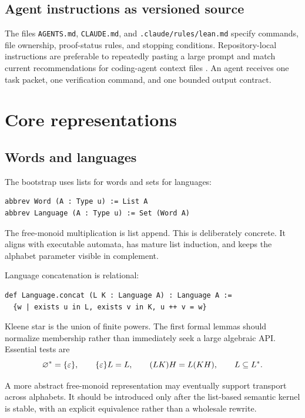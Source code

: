 \documentclass{amsart}
\begin{document}
\subsection{Agent instructions as versioned source}

The files \nolinkurl{AGENTS.md}, \nolinkurl{CLAUDE.md}, and \nolinkurl{.claude/rules/lean.md} specify commands, file ownership, proof-status rules, and stopping conditions.  Repository-local instructions are preferable to repeatedly pasting a large prompt and match current recommendations for coding-agent context files \cite{openaiAgentsMD2026,anthropicClaudeBestPractices2026}.  An agent receives one task packet, one verification command, and one bounded output contract.

\section{Core representations}

\subsection{Words and languages}

The bootstrap uses lists for words and sets for languages:
\begin{lstlisting}[language={}]
abbrev Word (A : Type u) := List A
abbrev Language (A : Type u) := Set (Word A)
\end{lstlisting}
The free-monoid multiplication is list append.  This is deliberately concrete.  It aligns with executable automata, has mature list induction, and keeps the alphabet parameter visible in complement.

Language concatenation is relational:
\begin{lstlisting}[language={}]
def Language.concat (L K : Language A) : Language A :=
  {w | exists u in L, exists v in K, u ++ v = w}
\end{lstlisting}
Kleene star is the union of finite powers.  The first formal lemmas should normalize membership rather than immediately seek a large algebraic API.  Essential tests are
\[
\varnothing^\ast=\{\varepsilon\},\qquad
\{\varepsilon\}L=L,\qquad
(LK)H=L(KH),\qquad
L\subseteq L^\ast.
\]

\begin{remark}
A more abstract free-monoid representation may eventually support transport across alphabets.  It should be introduced only after the list-based semantic kernel is stable, with an explicit equivalence rather than a wholesale rewrite.
\end{remark}
\end{document}
